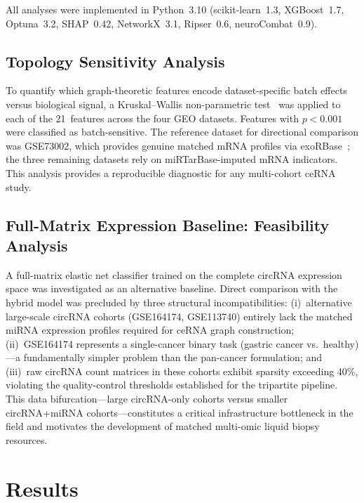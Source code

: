 \documentclass[12pt]{article}
\begin{document}
All analyses were implemented in Python~3.10 (scikit-learn~1.3,
XGBoost~1.7, Optuna~3.2, SHAP~0.42, NetworkX~3.1, Ripser~0.6,
neuroCombat~0.9).

\subsection{Topology Sensitivity Analysis}

To quantify which graph-theoretic features encode dataset-specific
batch effects versus biological signal, a Kruskal--Wallis
non-parametric test~\citep{kruskal1952} was applied to each of the
21~features across the four GEO datasets. Features with $p < 0.001$
were classified as batch-sensitive. The reference dataset for
directional comparison was GSE73002, which provides genuine matched
mRNA profiles via exoRBase~\citep{li2018}; the three remaining datasets
rely on miRTarBase-imputed mRNA indicators. This analysis provides a
reproducible diagnostic for any multi-cohort ceRNA study.

\subsection{Full-Matrix Expression Baseline: Feasibility Analysis}

A full-matrix elastic net classifier trained on the complete circRNA
expression space was investigated as an alternative baseline. Direct
comparison with the hybrid model was precluded by three structural
incompatibilities: (i)~alternative large-scale circRNA cohorts
(GSE164174, GSE113740) entirely lack the matched miRNA expression
profiles required for ceRNA graph construction; (ii)~GSE164174
represents a single-cancer binary task (gastric cancer
vs.\ healthy)---a fundamentally simpler problem than the pan-cancer
formulation; and (iii)~raw circRNA count matrices in these cohorts
exhibit sparsity exceeding 40\%, violating the quality-control
thresholds established for the tripartite pipeline. This data
bifurcation---large circRNA-only cohorts versus smaller
circRNA+miRNA cohorts---constitutes a critical infrastructure
bottleneck in the field and motivates the development of matched
multi-omic liquid biopsy resources.

\section{Results}
\end{document}
